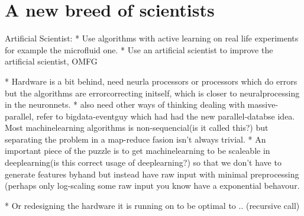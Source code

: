 \documentclass{article}
\begin{document}
    
        

\section{A new breed of scientists}

    Artificial Scientist: 
    * Use algorithms with active learning on real life experiments for example the
    microfluid one.
    * Use an artificial scientist to improve the artificial scientist, OMFG

    * Hardware is a bit  behind, need neurla processors or processors which do
    errors but the algorithms are errorcorrecting initself, which is closer to
    neuralprocessing in the neuronnets.
    * also need other ways of thinking dealing with massive-parallel, refer to
    bigdata-eventguy which had had the new parallel-databse idea. Most
    machinelearning algorithms is non-sequencial(is it called this?) but separating
    the problem in a map-reduce fasion isn't always trivial.
    * An important piece of the puzzle is to get machinelearning to be scaleable in
    deeplearning(is this correct usage of deeplearning?) so that we don't have to
    generate features byhand but instead have raw input with minimal preprocessing
    (perhaps only log-scaling some raw input you know have a exponential behavour.

    * Or redesigning the hardware it is running on to be optimal to .. (recursive
    call)
\end{document}
